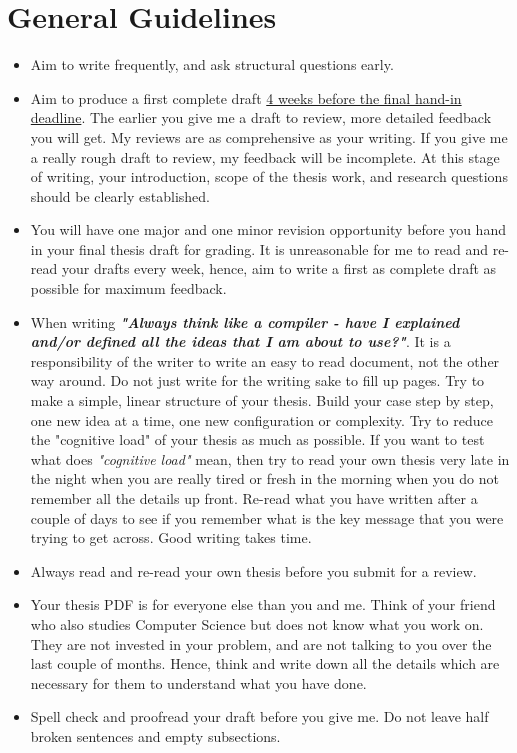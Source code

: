 \section*{General Guidelines}
\begin{itemize}
    \item Aim to write frequently, and ask structural questions early.
    
    \item Aim to produce a first complete draft \underline{4 weeks before the final hand-in deadline}. The earlier you 
    give me a draft to review, more detailed feedback you will get. My reviews are as comprehensive as your writing. 
    If you give me a really rough draft to review, my feedback will be incomplete. At this stage of writing, your introduction, 
    scope of the thesis work, and research questions should be clearly established.   
    
    \item You will have one major and one minor revision opportunity before you hand in your final thesis draft for grading. 
    It is unreasonable for me to read and re-read your drafts every week, hence, aim to write a first as complete 
    draft as possible for maximum feedback.
     
    \item When writing \textbf{\textit{"Always think like a compiler - have I explained and/or defined all the ideas that I am about to use?"}}. 
    It is a responsibility of the writer to write an easy to read document, not the other way around. Do not just 
    write for the writing sake to fill up pages. Try to make a simple, linear structure of your thesis. 
    Build your case step by step, one new idea at a time, one new configuration or complexity. Try 
    to reduce the "cognitive load" of your thesis as much as possible. If you want to test what 
    does \textit{"cognitive load"} mean, then try to read your own thesis very late in the night when you are really 
    tired or fresh in the morning when you do not remember all the details up front. Re-read what you have written 
    after a couple of days to see if you remember what is the key message that you were trying to get across.
    Good writing takes time.  
    
    \item Always read and re-read your own thesis before you submit for a review. 
    
    \item Your thesis PDF is for everyone else than you and me. Think of your friend who also studies Computer Science 
    but does not know what you work on. They are not invested in your problem, and are not talking to you over the 
    last couple of months. Hence, think and write down all the details which are necessary for them to understand 
    what you have done.
    
    \item Spell check and proofread your draft before you give me. Do not leave half broken sentences and empty 
    subsections.
     
\end{itemize}

